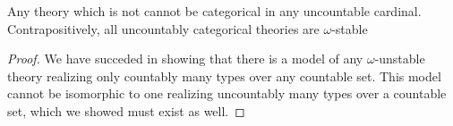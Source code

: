 \begin{theorem}\label{theorem_omega_stability_categoricity}
Any theory which is not \omst cannot be categorical in any uncountable cardinal. Contrapositively, all uncountably categorical theories are \(\omega\)-stable
\end{theorem}

\begin{proof}
We have succeded in showing that there is a model of any \(\omega\)-unstable theory realizing only countably many types over any countable set.
This model cannot be isomorphic to one realizing uncountably many types over a countable set, which we showed must exist as well. %
\end{proof}

